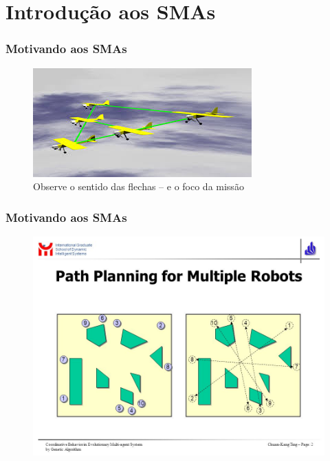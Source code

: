 

\section{Introdução aos SMAs}

\begin{frame}

  \frametitle{Motivando aos SMAs}
    
    
\begin{figure}[!ht]
\centering
\includegraphics[height =.6\textheight,width=.7\textwidth]{figuras/agentes_vizinhos01.jpeg}
\caption{Observe o sentido das flechas --  e  o foco da missão}
\end{figure}
    
    
\end{frame}


\begin{frame}
\frametitle{Motivando aos SMAs}

\begin{figure}[!ht]
\centering
\includegraphics[height =.6\textheight,width=.7\textwidth]{figuras/agentes_vizinhos02.jpeg}
\end{figure}
\end{frame}

